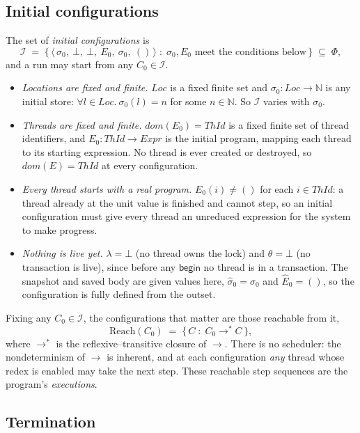 \documentclass[manuscript,nonacm]{acmart}
\theoremstyle{acmdefinition}
\newcommand{\Loc}{\mathit{Loc}}
\newcommand{\ThId}{\mathit{ThId}}   %
\newcommand{\Expr}{\mathit{Expr}}
\newcommand{\unit}{()}
\newcommand{\bbegin}{\textsf{begin}}
\begin{document}
\subsection{Initial configurations}

The set of \emph{initial configurations} is
\[
\mathcal{I} \;=\;
\bigl\{\, \langle\, \sigma_0,\ \bot,\ \bot,\ E_0,\ \sigma_0,\ \unit \,\rangle
\;:\; \sigma_0, E_0 \text{ meet the conditions below} \,\bigr\}
\;\subseteq\; \Phi ,
\]
and a run may start from any $C_0 \in \mathcal{I}$.
\begin{itemize}
\item \emph{Locations are fixed and finite.} $\Loc$ is a fixed finite set and
$\sigma_0 : \Loc \rightarrow \mathbb{N}$ is any initial store: $\forall l \in \Loc.\
\sigma_0(l) = n$ for some $n \in \mathbb{N}$. So $\mathcal{I}$ varies with $\sigma_0$.
\item \emph{Threads are fixed and finite.} $dom(E_0) = \ThId$ is a fixed finite set
of thread identifiers, and $E_0 : \ThId \rightarrow \Expr$ is the initial program,
mapping each thread to its starting expression. No thread is ever created or
destroyed, so $dom(E) = \ThId$ at every configuration.
\item \emph{Every thread starts with a real program.} $E_0(i) \neq \unit$ for each
$i \in \ThId$: a thread already at the unit value is finished and cannot step, so an
initial configuration must give every thread an unreduced expression for the system
to make progress.
\item \emph{Nothing is live yet.} $\lambda = \bot$ (no thread owns the lock) and
$\theta = \bot$ (no transaction is live), since before any $\bbegin$ no thread is in
a transaction. The snapshot and saved body are given values here,
$\hat{\sigma}_0 = \sigma_0$ and $\hat{E}_0 = \unit$, so the configuration is fully
defined from the outset.
\end{itemize}

Fixing any $C_0 \in \mathcal{I}$, the configurations that matter are those
reachable from it,
\[
\mathrm{Reach}(C_0) \;=\; \{\, C \;:\; C_0 \rightarrow^{*} C \,\},
\]
where $\rightarrow^{*}$ is the reflexive--transitive closure of $\rightarrow$.
There is no scheduler: the nondeterminism of $\rightarrow$ is inherent, and at each
configuration \emph{any} thread whose redex is enabled may take the next step.
These reachable step sequences are the program's \emph{executions}.


\subsection{Termination}
\end{document}
